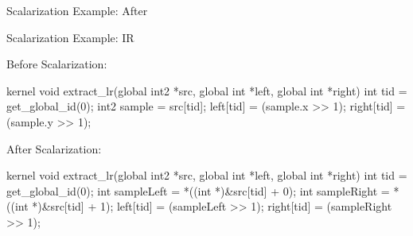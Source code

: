 \begin{frame}{Scalarization Example: After}


\end{frame}


\begin{frame}[fragile]{Scalarization Example: IR}

Before Scalarization:
\begin{codebox}
kernel void extract_lr(global int2 *src, global int *left, global int *right) {
    int tid = get_global_id(0);
    int2 sample = src[tid];
    left[tid] = (sample.x >> 1);
    right[tid] = (sample.y >> 1);
}
\end{codebox}

After Scalarization:
\begin{codebox}
kernel void extract_lr(global int2 *src, global int *left, global int *right) {
    int tid = get_global_id(0);
    int sampleLeft = *((int *)&src[tid] + 0);
    int sampleRight = *((int *)&src[tid] + 1);
    left[tid] = (sampleLeft >> 1);
    right[tid] = (sampleRight >> 1);
}
\end{codebox}

\end{frame}


